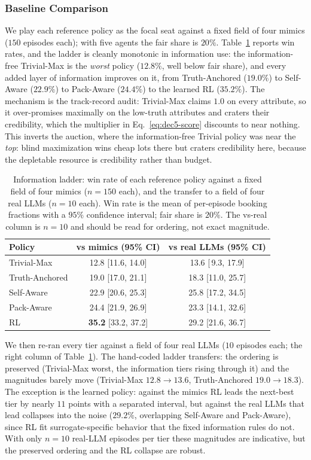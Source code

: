 \documentclass[conference]{IEEEtran}
\begin{document}
\subsubsection{Baseline Comparison}
\label{sec:dec5-ladder}
We play each reference policy as the focal seat against a fixed field of four mimics ($150$ episodes each); with five agents the fair share is $20\%$. Table~\ref{tab:dec5_ladder} reports win rates, and the ladder is cleanly monotonic in information use: the information-free Trivial-Max is the \emph{worst} policy ($12.8\%$, well below fair share), and every added layer of information improves on it, from Truth-Anchored ($19.0\%$) to Self-Aware ($22.9\%$) to Pack-Aware ($24.4\%$) to the learned RL ($35.2\%$). The mechanism is the track-record audit: Trivial-Max claims $1.0$ on every attribute, so it over-promises maximally on the low-truth attributes and craters their credibility, which the multiplier in Eq.~\eqref{eq:dec5-score} discounts to near nothing. This inverts the auction, where the information-free Trivial policy was near the \emph{top}: blind maximization wins cheap lots there but craters credibility here, because the depletable resource is credibility rather than budget.

\begin{table}[htbp]
\caption{Information ladder: win rate of each reference policy against a fixed field of four mimics ($n=150$ each), and the transfer to a field of four real LLMs ($n=10$ each). Win rate is the mean of per-episode booking fractions with a $95\%$ confidence interval; fair share is $20\%$. The vs-real column is $n=10$ and should be read for ordering, not exact magnitude.}
\label{tab:dec5_ladder}
\centering
\begin{tabular}{lcc}
\hline
Policy & vs mimics (95\% CI) & vs real LLMs (95\% CI) \\
\hline
Trivial-Max    & 12.8 [11.6, 14.0] & 13.6 [\,9.3, 17.9] \\
Truth-Anchored & 19.0 [17.0, 21.1] & 18.3 [11.0, 25.7] \\
Self-Aware     & 22.9 [20.6, 25.3] & 25.8 [17.2, 34.5] \\
Pack-Aware     & 24.4 [21.9, 26.9] & 23.3 [14.1, 32.6] \\
RL             & \textbf{35.2} [33.2, 37.2] & 29.2 [21.6, 36.7] \\
\hline
\end{tabular}
\end{table}

We then re-ran every tier against a field of four real LLMs ($10$ episodes each; the right column of Table~\ref{tab:dec5_ladder}). The hand-coded ladder transfers: the ordering is preserved (Trivial-Max worst, the information tiers rising through it) and the magnitudes barely move (Trivial-Max $12.8\to13.6$, Truth-Anchored $19.0\to18.3$). The exception is the learned policy: against the mimics RL leads the next-best tier by nearly $11$ points with a separated interval, but against the real LLMs that lead collapses into the noise ($29.2\%$, overlapping Self-Aware and Pack-Aware), since RL fit surrogate-specific behavior that the fixed information rules do not. With only $n=10$ real-LLM episodes per tier these magnitudes are indicative, but the preserved ordering and the RL collapse are robust.
\end{document}
